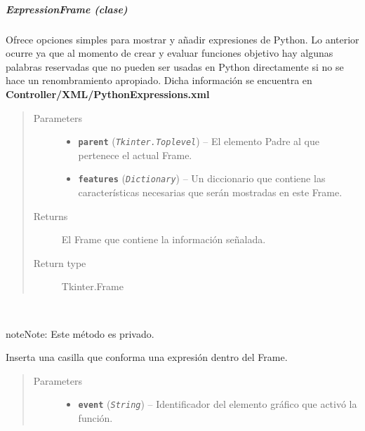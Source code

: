 \documentclass[class=report, crop=false]{standalone}
\begin{document}
\subparagraph{ExpressionFrame (clase)}
\label{sec:a_3_3_2_3_3_1}
\begin{fulllineitems}

\begin{DUlineblock}{0em}
\item[] Ofrece opciones simples para mostrar y añadir expresiones
de Python.\break 
Lo anterior ocurre ya que al momento de crear y evaluar funciones 
objetivo hay algunas palabras reservadas que no pueden ser usadas 
en Python directamente si no se hace un renombramiento apropiado.\break
Dicha información se encuentra en \textbf{Controller/XML/PythonExpressions.xml}
\end{DUlineblock}

\begin{quote}\begin{description}
\item[{Parameters}] \leavevmode\begin{itemize}
\item \textbf{\texttt{parent}} (\emph{\texttt{Tkinter.Toplevel}}) -- El elemento Padre al que pertenece el actual Frame.
\item \textbf{\texttt{features}} (\emph{\texttt{Dictionary}}) -- Un diccionario que contiene las características necesarias que serán mostradas en este Frame.
\end{itemize}

\item[{Returns}] \leavevmode
El Frame que contiene la información señalada.
\item[{Return type}] \leavevmode
Tkinter.Frame
\end{description}\end{quote}


\begin{fulllineitems}

~

\begin{notice}{note}{Note:}
Este método es privado.
\end{notice}

Inserta una casilla que conforma una expresión
dentro del Frame.

\begin{quote}\begin{description}
\item[{Parameters}] \leavevmode\begin{itemize}
\item \textbf{\texttt{event}} (\emph{\texttt{String}}) -- Identificador del elemento gráfico que activó la función.
\end{itemize}
\end{description}\end{quote}


\end{fulllineitems}
\end{fulllineitems}
\end{document}

